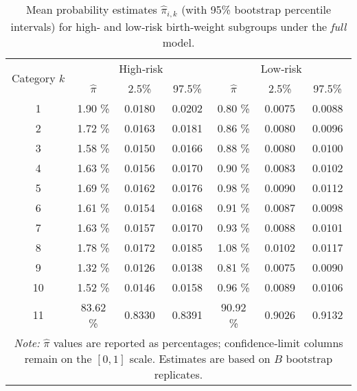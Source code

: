 \begin{table}[H]
\centering
\caption{Mean probability estimates $\hat{\pi}_{i,k}$ (with 95\% bootstrap percentile intervals) for high‑ and low‑risk birth‑weight subgroups under the \emph{full} model.}
\label{tab:pi_mean_full}
\begin{tabular}{ccccccc}
\toprule
\multirow{2}{*}{Category $k$} & \multicolumn{3}{c}{High‑risk} & \multicolumn{3}{c}{Low‑risk} \\
\cmidrule(lr){2-4}\cmidrule(lr){5-7}
 & $\hat{\pi}$ & 2.5\% & 97.5\% & $\hat{\pi}$ & 2.5\% & 97.5\% \\
\midrule
1  & 1.90 \% & 0.0180 & 0.0202 & 0.80 \% & 0.0075 & 0.0088 \\
2  & 1.72 \% & 0.0163 & 0.0181 & 0.86 \% & 0.0080 & 0.0096 \\
3  & 1.58 \% & 0.0150 & 0.0166 & 0.88 \% & 0.0080 & 0.0100 \\
4  & 1.63 \% & 0.0156 & 0.0170 & 0.90 \% & 0.0083 & 0.0102 \\
5  & 1.69 \% & 0.0162 & 0.0176 & 0.98 \% & 0.0090 & 0.0112 \\
6  & 1.61 \% & 0.0154 & 0.0168 & 0.91 \% & 0.0087 & 0.0098 \\
7  & 1.63 \% & 0.0157 & 0.0170 & 0.93 \% & 0.0088 & 0.0101 \\
8  & 1.78 \% & 0.0172 & 0.0185 & 1.08 \% & 0.0102 & 0.0117 \\
9  & 1.32 \% & 0.0126 & 0.0138 & 0.81 \% & 0.0075 & 0.0090 \\
10 & 1.52 \% & 0.0146 & 0.0158 & 0.96 \% & 0.0089 & 0.0106 \\
11 & 83.62 \% & 0.8330 & 0.8391 & 90.92 \% & 0.9026 & 0.9132 \\
\bottomrule
\multicolumn{7}{p{0.9\textwidth}}{\textit{Note:} $\hat{\pi}$ values are reported as percentages; confidence‑limit columns remain on the \([0,1]\) scale.  Estimates are based on $B$ bootstrap replicates.}\\
\end{tabular}
\end{table}


